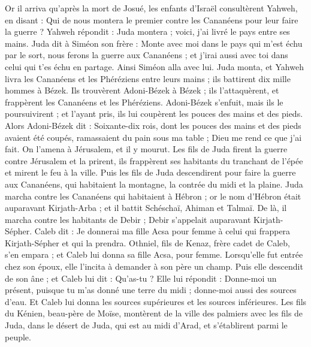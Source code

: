 \begin{multicols}{2}
\VerseOne{}Or il arriva qu'après la mort de Josué, les enfants d'Israël consultèrent Yahweh, en disant : Qui de nous montera le premier contre les Cananéens pour leur faire la guerre ?
Yahweh répondit : Juda montera ; voici, j'ai livré le pays entre ses mains.
Juda dit à Siméon son frère : Monte avec moi dans le pays qui m'est échu par le sort, nous ferons la guerre aux Cananéens ; et j'irai aussi avec toi dans celui qui t’es échu en partage. Ainsi Siméon alla avec lui.
Juda monta, et Yahweh livra les Cananéens et les Phéréziens entre leurs mains ; ils battirent dix mille hommes à Bézek.
Ils trouvèrent Adoni-Bézek à Bézek ; ils l'attaquèrent, et frappèrent les Cananéens et les Phéréziens.
Adoni-Bézek s'enfuit, mais ils le poursuivirent ; et l'ayant pris, ils lui coupèrent les pouces des mains et des pieds.
Alors Adoni-Bézek dit : Soixante-dix rois, dont les pouces des mains et des pieds avaient été coupés, ramassaient du pain sous ma table ; Dieu me rend ce que j’ai fait. On l’amena à Jérusalem, et il y mourut.
Les fils de Juda firent la guerre contre Jérusalem et la prirent, ils frappèrent ses habitants du tranchant de l'épée et mirent le feu à la ville.
Puis les fils de Juda descendirent pour faire la guerre aux Cananéens, qui habitaient la montagne, la contrée du midi et la plaine.
Juda marcha contre les Cananéens qui habitaient à Hébron ; or le nom d'Hébron était auparavant Kirjath-Arba ; et il battit Schéschaï, Ahiman et Talmaï.
De là, il marcha contre les habitants de Debir ; Debir s’appelait auparavant Kirjath-Sépher.
Caleb dit : Je donnerai ma fille Acsa pour femme à celui qui frappera Kirjath-Sépher et qui la prendra.
Othniel, fils de Kenaz, frère cadet de Caleb, s’en empara ; et Caleb lui donna sa fille Acsa, pour femme.
Lorsqu’elle fut entrée chez son époux, elle l'incita à demander à son père un champ. Puis elle descendit de son âne ; et Caleb lui dit : Qu'as-tu ?
Elle lui répondit : Donne-moi un présent, puisque tu m'as donné une terre du midi ; donne-moi aussi des sources d'eau. Et Caleb lui donna les sources supérieures et les sources inférieures.
Les fils du Kénien, beau-père de Moïse, montèrent de la ville des palmiers avec les fils de Juda, dans le désert de Juda, qui est au midi d'Arad,  et s'établirent parmi le peuple.

\end{multicols}
